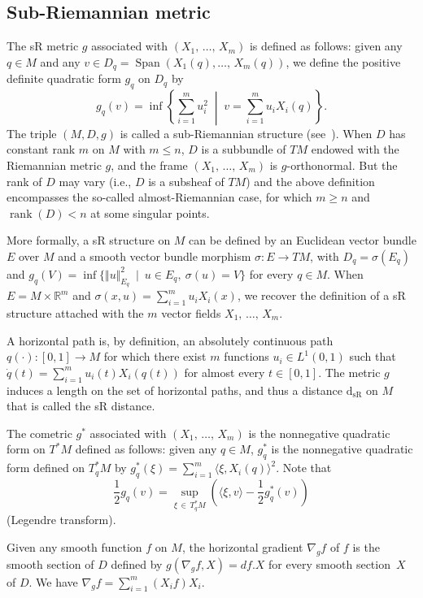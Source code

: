 \documentclass[10pt]{amsart}
\theoremstyle{definition}\newtheorem{defi}[theo]{Definition}\newtheorem{rema}[theo]{Remark}\newtheorem{exam}[theo]{Example}\newtheorem{exem}[theo]{Example}\newtheorem{nota}[theo]{Notation}
\newcommand*\R{\mathbb{R}}
\DeclareMathOperator{\Span}{Span}
\DeclareMathOperator{\rank}{rank}
\newcommand{\dsR}{\mathrm{d}_{\mathrm{sR}}}
\renewcommand{\geq}{\geqslant}
\renewcommand{\leq}{\leqslant}
\begin{document}
\break

\subsection{Sub-Riemannian metric}
The sR metric $g$ associated with $(X_1,\,\ldots,\,X_m)$ is defined as follows: given any $q\in M$ and any $v\in D_q=\Span(X_1(q),\ldots,\,X_m(q))$, we define the positive definite quadratic form $g_q$ on $D_q$ by
\[
g_q(v) = \inf \left\{ \sum_{i=1}^m u_i^2 \; \middle| \; v=\sum_{i=1}^mu_iX_i(q) \right\}.
\]
The triple $(M,D,g)$ is called a sub-Riemannian structure (see~\cite{Bellaiche,Rifford_2014}). When $D$ has constant rank $m$ on $M$ with $m\leq n$, $D$ is a subbundle of $TM$ endowed with the Riemannian metric $g$, and the frame $(X_1,\,\ldots,\,X_m)$ is $g$-orthonormal. But the rank of $D$ may vary (i.e., $D$ is a subsheaf of $TM$) and the above definition encompasses the so-called almost-Riemannian case, for which $m\geq n$ and $\rank(D)<n$ at some singular points.

More formally, a sR structure on $M$ can be defined by an Euclidean vector bundle $E$ over $M$ and a smooth vector bundle morphism $\sigma:E\rightarrow TM$, with $D_q=\sigma(E_q)$ and $g_q(V)=\inf\{\Vert u\Vert_{E_q}^2\ \mid\ u\in E_q,\ \sigma(u)=V\}$ for every $q\in M$. When $E=M \times\R^m$ and $\sigma(x,u)=\sum_{i=1}^m u_i X_i(x)$, we recover the definition of a sR structure attached with the $m$ vector fields $X_1,\,\ldots,\,X_m$.

A horizontal path is, by definition, an absolutely continuous path $q(\cdot):[0,1]\rightarrow M$ for which there exist $m$ functions $u_i\in L^1(0,1)$ such that $\dot q(t) = \sum_{i=1}^m u_i(t)X_i(q(t))$ for almost every $t\in[0,1]$. The metric $g$ induces a length on the set of horizontal paths, and thus a distance $\dsR$ on $M$ that is called the sR distance.

The cometric $g^*$ associated with $(X_1,\,\ldots,\,X_m)$ is the nonnegative quadratic form on $T^*M$ defined as follows: given any $q\in M$, $g^*_q$ is the nonnegative quadratic form defined on $T_q^*M$ by $g^*_q(\xi)=\sum_{i=1}^m\langle\xi,X_i(q)\rangle^2$. Note that
\[
\frac{1}{2} g_q(v) = \sup_{\xi\,\in\,T^*_qM} \left(\langle\xi,v\rangle - \frac{1}{2}g^*_q(v) \right)
\]
(Legendre transform).

Given any smooth function $f$ on $M$, the horizontal gradient $\nabla_gf$ of $f$ is the smooth section of $D$ defined by $g(\nabla_gf,X)=df.X$ for every smooth section~$X$ of $D$. We have $\nabla_gf = \sum_{i=1}^m (X_if)X_i$.
\end{document}
